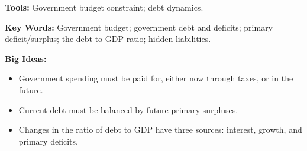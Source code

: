 \textbf{Tools:} Government budget constraint; debt dynamics.

\textbf{Key Words:} Government budget; government debt and deficits; primary deficit/surplus;
the debt-to-GDP ratio; hidden liabilities.

\textbf{Big Ideas:}
\begin{itemize}
\item Government spending must be paid for, either now through taxes, or in the
future.
\item Current debt must be balanced by future primary surpluses.
\item Changes in the ratio of debt to GDP have three sources:
interest, growth, and primary deficits.
\end{itemize}
